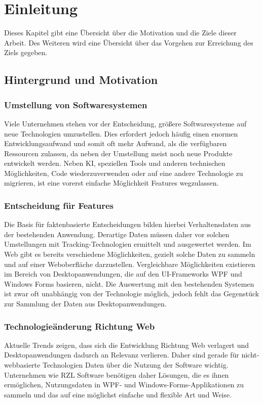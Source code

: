 \chapter{Einleitung}
\label{cha:introduction}
Dieses Kapitel gibt eine Übersicht über die Motivation und die Ziele dieser Arbeit. 
Des Weiteren wird eine Übersicht über das Vorgehen zur Erreichung des Ziels gegeben.

\section{Hintergrund und Motivation}

\subsection{Umstellung von Softwaresystemen}
Viele Unternehmen stehen vor der Entscheidung, größere Softwaresysteme auf neue Technologien umzustellen. Dies erfordert jedoch häufig einen enormen Entwicklungsaufwand und somit oft mehr Aufwand, als die verfügbaren Ressourcen zulassen, da neben der Umstellung meist noch neue Produkte entwickelt werden. Neben KI, speziellen Tools und anderen technischen Möglichkeiten, Code wiederzuverwenden oder auf eine andere Technologie zu migrieren, ist eine vorerst einfache Möglichkeit Features wegzulassen.

\subsection{Entscheidung für Features}
Die Basis für faktenbasierte Entscheidungen bilden hierbei Verhaltensdaten aus der bestehenden Anwendung. Derartige Daten müssen daher vor solchen Umstellungen mit Tracking-Technologien ermittelt und ausgewertet werden. Im Web gibt es bereits verschiedene Möglichkeiten, gezielt solche Daten zu sammeln und auf einer Weboberfläche darzustellen. Vergleichbare Möglichkeiten existieren im Bereich von Desktopanwendungen, die auf den UI-Frameworks WPF und Windows Forms basieren, nicht. Die Auswertung mit den bestehenden Systemen ist zwar oft unabhängig von der Technologie möglich, jedoch fehlt das Gegenstück zur Sammlung der Daten aus Desktopanwendungen.

\subsection{Technologieänderung Richtung Web}
Aktuelle Trends zeigen, dass sich die Entwicklung Richtung Web verlagert und Desktopanwendungen dadurch an Relevanz verlieren. Daher sind gerade für nicht-webbasierte Technologien Daten über die Nutzung der Software wichtig. Unternehmen wie RZL Software benötigen daher Lösungen, die es ihnen ermöglichen, Nutzungsdaten in WPF- und Windows-Forms-Applikationen zu sammeln und das auf eine möglichst einfache und flexible Art und Weise.

